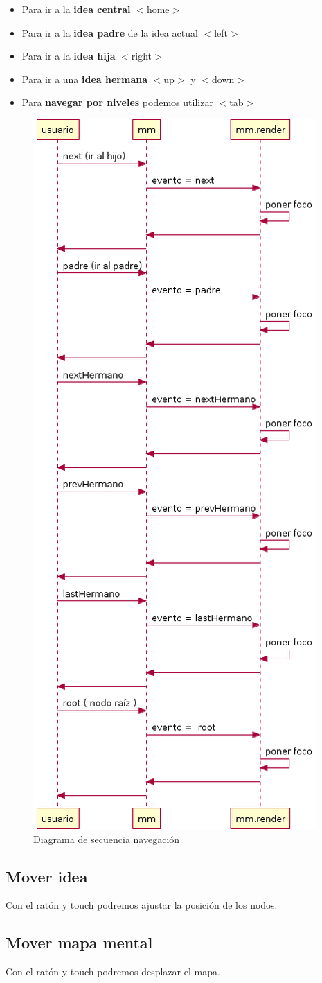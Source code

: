 \begin{itemize}
\item Para ir a la \textbf{idea central} $<$home$>$
\item Para ir a la \textbf{idea padre} de la idea actual $<$left$>$
\item Para ir a la \textbf{idea hija} $<$right$>$
\item Para ir a una \textbf{idea hermana} $<$up$>$ y $<$down$>$
\item Para \textbf{navegar por niveles} podemos utilizar $<$tab$>$
\end{itemize}

\begin{figure}[tbph]
\centering
\includegraphics[width=0.4\linewidth]{imagenes/diagrama-seq-navegacion}
\caption{Diagrama de secuencia navegación}
\label{fig:diagrama-seq-navegacion}
\end{figure}


\subsection{Mover idea}
Con el ratón y touch podremos ajustar la posición de los nodos.

\subsection{Mover mapa mental}
Con el ratón y touch podremos desplazar el mapa.

